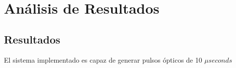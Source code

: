 \chapter{Análisis de Resultados}
\section{Resultados}
El sistema implementado es capaz de generar pulsos ópticos de 10 $\mu \si{seconds}$